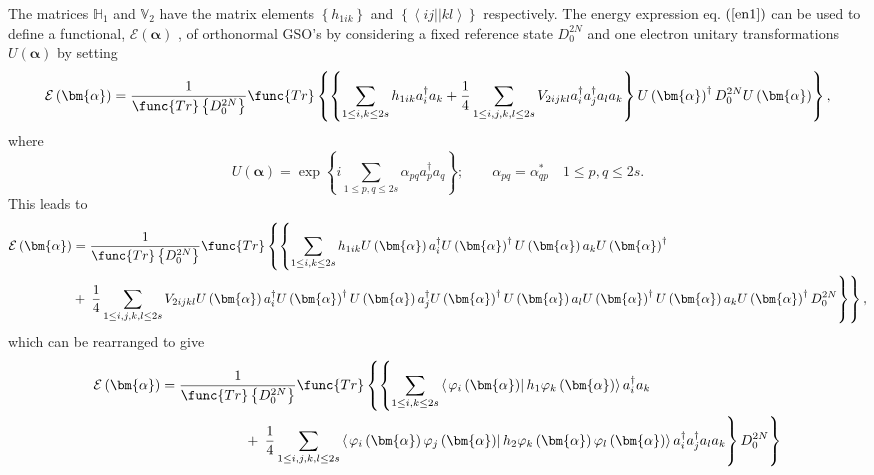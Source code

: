\documentclass{preprint}
\begin{document}
The matrices $\mathbb{H}_{1}$ and $\mathbb{V}_{2}$ have the matrix elements $%
\left\{ h_{1ik}\right\} $ and $\left\{ \left\langle ij||kl\right\rangle
\right\} $ respectively. The energy expression eq. $\left( \ref{en1}\right) $
can be used to define a functional, $\mathcal{E}\left( \bm{\alpha }\right) $%
, of orthonormal GSO's by considering a fixed reference state $D_{0}^{2N}$
and one electron unitary transformations $U\left( \bm{\alpha
}\right) $ by setting%
\begin{equation}
\mathcal{E}\left( \bm{\alpha}\right) =\frac{1}{\func{Tr}\left\{
D_{0}^{2N}\right\} }\func{Tr}\left\{ \left\{ \sum_{1\leq i,k\leq
2s}h_{1ik}a_{i}^{\dagger }a_{k}+\frac{1}{4}\sum_{1\leq i,j,k,l\leq
2s}V_{2ijkl}a_{i}^{\dagger }a_{j}^{\dagger }a_{l}a_{k}\right\} U\left( %
\bm{\alpha}\right) ^{\dagger }D_{0}^{2N}U\left( \bm{\alpha}\right) \right\} ,
\end{equation}%
where
\begin{equation}
U\left( \bm{\alpha}\right) =\exp \left\{ i\sum_{1\leq p,q\leq 2s}\alpha
_{pq}a_{p}^{\dagger }a_{q}\right\} ;\qquad \alpha _{pq}=\alpha _{qp}^{\ast
}\quad 1\leq p,q\leq 2s.
\end{equation}%
This leads to
\begin{align}
\mathcal{E}\left( \bm{\alpha}\right) & =\frac{1}{\func{Tr}\left\{
D_{0}^{2N}\right\} }\func{Tr}\left\{ \left\{ \sum_{1\leq i,k\leq
2s}h_{1ik}U\left( \bm{\alpha}\right) a_{i}^{\dagger }U\left( \bm{\alpha}%
\right) ^{\dagger }U\left( \bm{\alpha}\right) a_{k}U\left( \bm{\alpha}%
\right) ^{\dagger }\right. \right.  \notag \\
& +\left. \left. \frac{1}{4}\sum_{1\leq i,j,k,l\leq 2s}V_{2ijkl}U\left( %
\bm{\alpha}\right) a_{i}^{\dagger }U\left( \bm{\alpha}\right) ^{\dagger
}U\left( \bm{\alpha}\right) a_{j}^{\dagger }U\left( \bm{\alpha}\right)
^{\dagger }U\left( \bm{\alpha}\right) a_{l}U\left( \bm{\alpha}\right)
^{\dagger }U\left( \bm{\alpha }\right) a_{k}U\left( \bm{\alpha}\right)
^{\dagger }D_{0}^{2N}\right\} \right\} ,
\end{align}%
which can be rearranged to give
\begin{align}
\mathcal{E}\left( \bm{\alpha}\right) & =\frac{1}{\func{Tr}\left\{
D_{0}^{2N}\right\} }\func{Tr}\left\{ \left\{ \sum_{1\leq i,k\leq
2s}\left\langle \left. \varphi _{i}\left( \bm{\alpha}\right) \right\vert
h_{1}\varphi _{k}\left( \bm{\alpha}\right) \right\rangle a_{i}^{\dagger
}a_{k}\right. \right.  \notag \\
& \qquad \qquad \qquad +\left. \left. \frac{1}{4}\sum_{1\leq i,j,k,l\leq
2s}\left\langle \left. \varphi _{i}\left( \bm{\alpha}\right) \varphi
_{j}\left( \bm{\alpha}\right) \right\vert h_{2}\varphi _{k}\left( \bm{\alpha}%
\right) \varphi _{l}\left( \bm{\alpha}\right) \right\rangle a_{i}^{\dagger
}a_{j}^{\dagger }a_{l}a_{k}\right\} D_{0}^{2N}\right\}
\end{align}%
\end{document}
